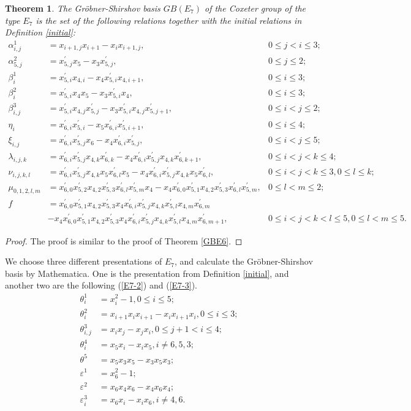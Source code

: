 \documentclass[UTF8]{amsart}
\newtheorem{theorem}[tpcl]{Theorem}
\theoremstyle{definition}
\theoremstyle{remark}
\numberwithin{equation}{section}
\begin{document}
\begin{theorem}
The Gr\"{o}bner-Shirshov basis $GB(E_7)$ of the Coxeter group of the type $E_7$ is  the set of  the following relations  together with the initial relations in Definition \ref{initial}:
\begin{align*}
\alpha_{i,j}^1&=x_{i+1,j}x_{i+1}-x_ix_{i+1,j}, &0\leq j<i\leq3;\\
\alpha_{5,j}^2&=x_{5,j}^{'}x_5-x_3x_{5,j}^{'} ,&0\leq j\leq 2;\\
\beta_i^1&=x_{5,i}^{'}x_{4,i}-x_4x_{5,i}^{'}x_{4,i+1}, &0\leq i\leq3;\\
\beta_i^2&=x_{5,i}^{'}x_4x_5-x_3x_{5,i}^{'}x_4  ,&0\leq i\leq3;\\
\beta_{i,j}^3&=x_{5,i}^{'}x_{4,j}x_{5,j}^{'}-x_3x_{5,i}^{'}x_{4,j}x_{5,j+1}^{'} ,&0\leq i<j\leq2;\\
\eta_i&=x_{6,i}^{'}x_{5,i}^{'}-x_5x_{6,i}^{'}x_{5,i+1}^{'} ,&0\leq i\leq4;\\
\xi_{i,j}&=x_{6,i}^{'}x_{5,j}^{'}x_6-x_4x_{6,i}^{'}x_{5,j}^{'} ,&0\leq i<j\leq5;\\
\lambda_{i,j,k}&=x_{6,i}^{'}x_{5,j}^{'}x_{4,k}x_{6,k}^{'}-x_4x_{6,i}^{'}x_{5,j}^{'}x_{4,k}x_{6,k+1}^{'} , &0\leq i<j<k\leq4;\\
\nu_{i,j,k,l}&=x_{6,i}^{'}x_{5,j}^{'}x_{4,k}x_5x_{6,l}^{'}x_5-x_4x_{6,i}^{'}x_{5,j}^{'}x_{4,k}x_5x_{6,l}^{'} ,&0\leq i<j<k\leq3,0\leq l\leq k;\\
\mu_{0,1,2,l,m}&=x_{6,0}^{'}x_{5,2}^{'}x_{4,2}x_{5,3}^{'}x_{6,l}^{'}x_{5,m}^{'}x_{4}-x_4x_{6,0}^{'}x_{5,1}^{'}x_{4,2}x_{5,3}^{'}x_{6,l}^{'}x_{5,m}^{'} ,&0\leq l<m\leq 2;\\
f&=x_{6,0}^{'}x_{5,1}^{'}x_{4,2}x_{5,3}^{'}x_4x_{6,i}^{'}x_{5,j}^{'}x_{4,k}x_{5,l}^{'}x_{4,m}x_{6,m}^{'} & \\
  &-x_4x_{6,0}^{'}x_{5,1}^{'}x_{4,2}x_{5,3}^{'}x_4x_{6,i}^{'}x_{5,j}^{'}x_{4,k}x_{5,l}^{'}x_{4,m}x_{6,m+1}^{'} ,&0\leq  i<j<k<l\leq 5,0\leq l<m\leq 5.
\end{align*}
\end{theorem}
\begin{proof}
  The proof is similar to the proof of Theorem \ref{GBE6}.
\end{proof}
We choose three different presentations of $E_7$, and calculate the Gr\"{o}bner-Shirshov basis by Mathematica.  One is the presentation from Definition \ref{initial}, and another two are the following (\ref{E7-2}) and (\ref{E7-3}).
\begin{equation}\label{E7-2}
\begin{aligned}
	\theta_i^1&=x_i^2-1 ,0\leq i\leq 5;\\
	\theta_i^2&=x_{i+1}x_ix_{i+1}-x_ix_{i+1}x_i ,0\leq i\leq 3;\\
	\theta_{i,j}^3&=x_ix_j-x_jx_i ,0\leq j+1<i\leq 4;\\
	\theta_i^4&=x_{5}x_i-x_ix_{5}, i\ne 6,5,3;\\
	\theta^5&=x_{5}x_{3}x_{5}-x_{3}x_{5}x_{3};\\
	\varepsilon^1&=x_6^2-1 ;\\
	\varepsilon^2&=x_6x_{4}x_6-x_{4}x_6x_{4} ;\\
	\varepsilon_i^3&=x_6x_i-x_ix_6, i\ne 4,6.\\
\end{aligned}
\end{equation}
\end{document}
